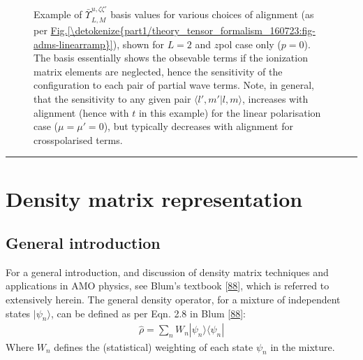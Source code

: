 \documentclass[letterpaper,table,10pt,english]{jupyterBook}
\begin{document}
\begin{figure}[htbp]
\centering
\capstart

\noindent{}
\caption{Example of \(\bar{\varUpsilon_{}}_{L,M}^{u,\zeta\zeta'}\) basis values for various choices of alignment (as per \hyperref[\detokenize{part1/theory_tensor_formalism_160723:fig-adms-linearramp}]{Fig.\@ \ref{\detokenize{part1/theory_tensor_formalism_160723:fig-adms-linearramp}}}), shown for \(L=2\) and \(z\)\sphinxhyphen{}pol case only (\(p=0\)). The basis essentially shows the obsevable terms if the ionization matrix elements are neglected, hence the sensitivity of the configuration to each pair of partial wave terms. Note, in general, that the sensitivity to any given pair \(\langle l',m'|l,m\rangle\), increases with alignment (hence with \(t\) in this example) for the linear polarisation case (\(\mu=\mu'=0\)), but typically decreases with alignment for cross\sphinxhyphen{}polarised terms.}\label{\detokenize{part1/theory_tensor_formalism_160723:fig-channelfunc-linearramp}}\end{figure}


\bigskip\hrule\bigskip


\sphinxstepscope


\section{Density matrix representation}
\label{\detokenize{part1/theory_density_matrices_190723:density-matrix-representation}}\label{\detokenize{part1/theory_density_matrices_190723:sec-density-mat-basic}}\label{\detokenize{part1/theory_density_matrices_190723::doc}}

\subsection{General introduction}
\label{\detokenize{part1/theory_density_matrices_190723:general-introduction}}\label{\detokenize{part1/theory_density_matrices_190723:sec-density-mat-intro}}
\sphinxAtStartPar
For a general introduction, and discussion of density matrix techniques and applications in AMO physics, see Blum’s textbook  {[}\hyperlink{cite.backmatter/bibliography:id525}{88}{]}, which is referred to extensively herein. The general density operator, for a mixture of independent states \(|\psi_{n}\rangle\), can be defined as per Eqn. 2.8 in Blum {[}\hyperlink{cite.backmatter/bibliography:id525}{88}{]}:
\begin{equation*}
\begin{split}
\hat{\rho}=\sum_{n}W_{n}|\psi_{n}\rangle\langle\psi_{n}|
\end{split}
\end{equation*}
\sphinxAtStartPar
Where \(W_{n}\) defines the (statistical) weighting of each state \(\psi_{n}\) in the mixture.
\end{document}
